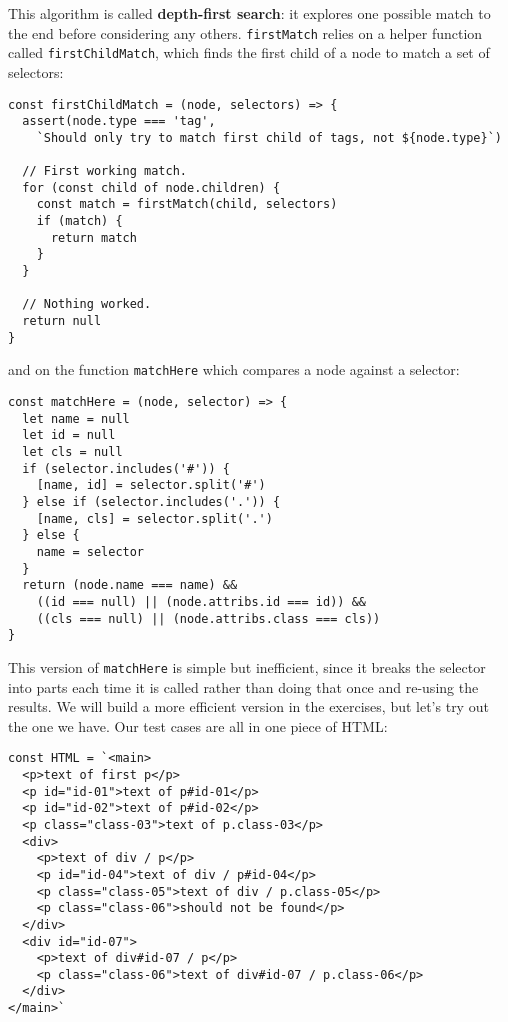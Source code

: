 \documentclass[krantzl]{krantz}
\newcommand{\glossref}[1]{\textbf{#1}}
\begin{document}
This algorithm is called \glossref{depth-first search}:
it explores one possible match to the end before considering any others.
\texttt{firstMatch} relies on a helper function called \texttt{firstChildMatch},
which finds the first child of a node to match a set of selectors:


\begin{lstlisting}[frame=tblr]
const firstChildMatch = (node, selectors) => {
  assert(node.type === 'tag',
    `Should only try to match first child of tags, not ${node.type}`)

  // First working match.
  for (const child of node.children) {
    const match = firstMatch(child, selectors)
    if (match) {
      return match
    }
  }

  // Nothing worked.
  return null
}
\end{lstlisting}



\noindent and on the function \texttt{matchHere} which compares a node against a selector:


\begin{lstlisting}[frame=tblr]
const matchHere = (node, selector) => {
  let name = null
  let id = null
  let cls = null
  if (selector.includes('#')) {
    [name, id] = selector.split('#')
  } else if (selector.includes('.')) {
    [name, cls] = selector.split('.')
  } else {
    name = selector
  }
  return (node.name === name) &&
    ((id === null) || (node.attribs.id === id)) &&
    ((cls === null) || (node.attribs.class === cls))
}
\end{lstlisting}



This version of \texttt{matchHere} is simple but inefficient,
since it breaks the selector into parts each time it is called
rather than doing that once and re-using the results.
We will build a more efficient version in the exercises,
but let’s try out the one we have.
Our test cases are all in one piece of HTML:


\begin{lstlisting}[frame=tblr]
const HTML = `<main>
  <p>text of first p</p>
  <p id="id-01">text of p#id-01</p>
  <p id="id-02">text of p#id-02</p>
  <p class="class-03">text of p.class-03</p>
  <div>
    <p>text of div / p</p>
    <p id="id-04">text of div / p#id-04</p>
    <p class="class-05">text of div / p.class-05</p>
    <p class="class-06">should not be found</p>
  </div>
  <div id="id-07">
    <p>text of div#id-07 / p</p>
    <p class="class-06">text of div#id-07 / p.class-06</p>
  </div>
</main>`
\end{lstlisting}
\end{document}
